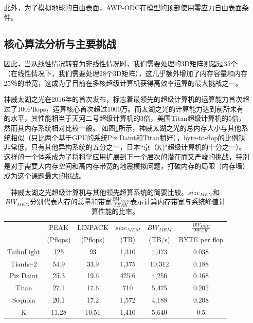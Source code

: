 \documentclass[degree=doctor]{thuthesis}
\begin{document}
此外，为了模拟地球的自由表面，AWP-ODC在模型的顶部使用零应力自由表面条件\cite{gottschammer2001accuracy}。

\subsection{核心算法分析与主要挑战}
因此，当从线性情况转变为非线性情况时，我们需要处理的3D矩阵则超过35个（在线性情况下，我们需要处理28个3D矩阵）\citep {roten2016high}，这几乎额外增加了内存容量和内存25％的带宽，这成为了目前在多核超级计算机获得高效率运算的最大挑战之一。

神威太湖之光在2016年的首次发布\citep{fu2016sunway}，标志着最领先的超级计算机的运算能力首次超过了100Pflops，运算核心首次超过1000万。而太湖之光的计算能力达到前所未有的水平，其性能相当于天河二号超级计算机的3倍，美国Titan超级计算机的5倍，然而其内存系统相对比较一般。 如图\ref{tb:supercomputer-comp}所示，神威太湖之光的总内存大小与其他系统相似（只比两个基于GPU的系统Piz Daint和Titan稍好），byte-to-flop的比例缺非常低，只有其他异构系统的五分之一，日本“京（K)"超级计算机的十分之一）。 这样的一个体系成为了将科学应用扩展到下一个层次的潜在而又严峻的挑战，特别是对于需要大内存空间和高内存带宽的地震模拟问题，打破内存的局限（内存墙）成为这个课题最大的挑战。

\begin{table}[ht]
\footnotesize
\caption{神威太湖之光超级计算机与其他领先超算系统的简要比较。$size_{MEM}$和$BW_{MEM}$分别代表内存的总量和带宽$\frac{BW_{MEM}}{PEAK}$表示计算内存带宽与系统峰值计算性能的比率。}
\label{tb:supercomputer-comp}
\center
\begin{tabular*}{0.8\columnwidth}{cccccc}
\hline\hline
   & PEAK & LINPACK & $size_{MEM}$  & $BW_{MEM}$ & $\frac{BW_{MEM}}{PEAK}$ \\
   & (Pflops) & (Pflops) & (TB) & (TB/s) & {BYTE per flop} \\
   \hline\hline
   TaihuLight & 125 & 93 & 1,310 & 4,473 & 0.038 \\\hline
   Tianhe-2 & 54.9 & 33.9 & 1,375 & 10,312 & 0.188 \\\hline
   Piz Daint & 25.3 & 19.6 & 425.6 & 4,256 & 0.168 \\\hline
   Titan & 27.1 & 17.6 & 710 & 5,475 & 0.202 \\\hline
   Sequoia & 20.1 & 17.2 & 1,572 & 4,188 & 0.208 \\\hline
   K & 11.28 & 10.51 & 1,410 & 5,640 & 0.5 \\\hline
\hline
\end{tabular*}
\end{table}
\end{document}
